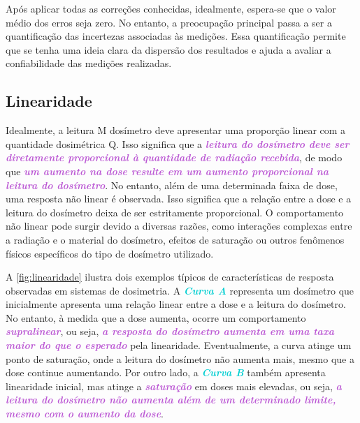 \documentclass[11pt,a4paper]{article}
\newcounter{exemplo}
\begin{document}
	Após aplicar todas as correções conhecidas, idealmente, espera-se que o valor médio dos erros seja zero. No entanto, a preocupação principal passa a ser a quantificação das incertezas associadas às medições. Essa quantificação permite que se tenha uma ideia clara da dispersão dos resultados e ajuda a avaliar a confiabilidade das medições realizadas.

\subsection*{Linearidade}

	Idealmente, a leitura M dosímetro deve apresentar uma proporção linear com a quantidade dosimétrica Q. Isso significa que a \textcolor{MediumOrchid}{\textit{\textbf{leitura do dosímetro deve ser diretamente proporcional à quantidade de radiação recebida}}}, de modo que \textcolor{MediumOrchid}{\textit{\textbf{um aumento na dose resulte em um aumento proporcional na leitura do dosímetro}}}. No entanto, além de uma determinada faixa de dose, uma resposta não linear é observada. Isso significa que a relação entre a dose e a leitura do dosímetro deixa de ser estritamente proporcional. O comportamento não linear pode surgir devido a diversas razões, como interações complexas entre a radiação e o material do dosímetro, efeitos de saturação ou outros fenômenos físicos específicos do tipo de dosímetro utilizado.

	A \ref{fig:linearidade} ilustra dois exemplos típicos de características de resposta observadas em sistemas de dosimetria. A \textcolor{DarkTurquoise}{\textit{\textbf{Curva A}}} representa um dosímetro que inicialmente apresenta uma relação linear entre a dose e a leitura do dosímetro. No entanto, à medida que a dose aumenta, ocorre um comportamento \textcolor{MediumOrchid}{\textit{\textbf{supralinear}}}, ou seja, \textcolor{MediumOrchid}{\textit{\textbf{a resposta do dosímetro aumenta em uma taxa maior do que o esperado}}} pela linearidade. Eventualmente, a curva atinge um ponto de saturação, onde a leitura do dosímetro não aumenta mais, mesmo que a dose continue aumentando. Por outro lado, a \textcolor{DarkTurquoise}{\textit{\textbf{Curva B}}} também apresenta linearidade inicial, mas atinge a \textcolor{MediumOrchid}{\textit{\textbf{saturação}}} em doses mais elevadas, ou seja, \textcolor{MediumOrchid}{\textit{\textbf{a leitura do dosímetro não aumenta além de um determinado limite, mesmo com o aumento da dose}}}.
\end{document}

